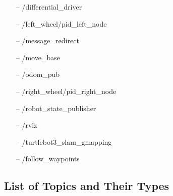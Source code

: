 \documentclass[12]{article}
\begin{document}
\begin{itemize}
    \item[--] /differential\_driver
    \item[--] /left\_wheel/pid\_left\_node
    \item[--] /message\_redirect
    \item[--] /move\_base
    \item[--] /odom\_pub
    \item[--] /right\_wheel/pid\_right\_node
    \item[--] /robot\_state\_publisher
    \item[--] /rviz
    \item[--] /turtlebot3\_slam\_gmapping
    \item[--] /follow\_waypoints 
\end{itemize} 

\subsection{List of Topics and Their Types}
\end{document}
